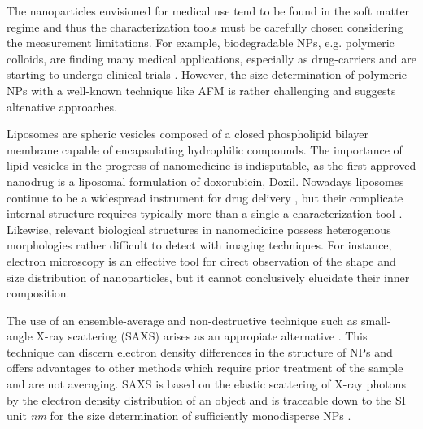 The nanoparticles envisioned for medical use tend to be found in the soft matter regime and thus the characterization tools must be carefully chosen considering the measurement limitations. For example, biodegradable NPs, e.g. polymeric colloids, are finding many medical applications, especially as drug-carriers \citep{kattan_phase_1992,vicent_polymer_2006} and are starting to undergo clinical trials \citep{patel_polymeric_2012,beija_colloidal_2012,cabral_progress_2014}. However, the size determination of polymeric NPs with a well-known technique like AFM is rather challenging \citep{wu_particle_2014} and suggests altenative approaches.

Liposomes are spheric vesicles composed of a closed phospholipid bilayer membrane capable of encapsulating hydrophilic compounds. The importance of lipid vesicles in the progress of nanomedicine is indisputable, as the first approved nanodrug is a liposomal formulation of doxorubicin, Doxil. Nowadays liposomes continue to be a widespread instrument for drug delivery \citep{perez-herrero_advanced_2015}, but their complicate internal structure requires typically more than a single a characterization tool \citep{khorasani_closing_2014}. Likewise, relevant biological structures in nanomedicine possess heterogenous morphologies rather difficult to detect with imaging techniques. For instance, electron microscopy is an effective tool for direct observation of the shape and size distribution of nanoparticles, but it cannot conclusively elucidate their inner composition.

The use of an ensemble-average and non-destructive technique such as small-angle X-ray scattering (SAXS) arises as an appropiate alternative \citep{leonard_jr_size_1952,motzkus_untersuchung_1959}. This technique can discern electron density differences in the structure of NPs and offers advantages to other methods which require prior treatment of the sample and are not averaging. SAXS is based on the elastic scattering of X-ray photons by the electron density distribution of an object and is traceable down to the SI unit \emph{nm} for the size determination of sufficiently monodisperse NPs \citep{meli_traceable_2012}. 


